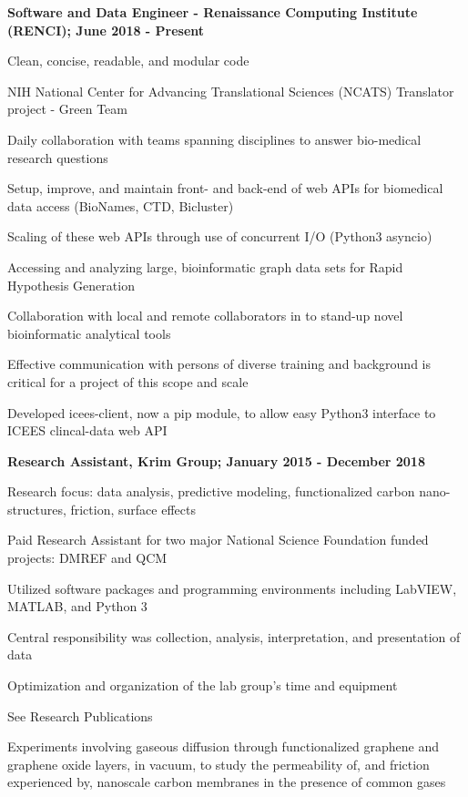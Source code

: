 \documentclass[letterpaper,final]{memoir}
\newcommand{\Sep}{\vspace{1.0em}}
\newcommand{\SmallSep}{\vspace{0.4em}}
\newcommand{\CVItem}[1]
	{\textbf{\color{Blue} #1}}
\begin{document}
\CVItem{Software and Data Engineer - Renaissance Computing Institute (RENCI); June 2018 - Present}
\begin{compactitem}[\color{Blue}$\circ$]
    
    \SmallSep
    \item Clean, concise, readable, and modular code
    \item NIH National Center for Advancing Translational Sciences (NCATS) Translator project - Green Team
    \item Daily collaboration with teams spanning disciplines to answer bio-medical research questions
    \item Setup, improve, and maintain front- and back-end of web APIs for biomedical data access (BioNames, CTD, Bicluster)
    \item Scaling of these web APIs through use of concurrent I/O (Python3 asyncio)
    \item Accessing and analyzing large, bioinformatic graph data sets for Rapid Hypothesis Generation
    \item Collaboration with local and remote collaborators in to stand-up novel bioinformatic analytical tools
    \item Effective communication with persons of diverse training and background is critical for a project of this scope and scale
    \item Developed icees-client, now a pip module, to allow easy Python3 interface to ICEES clincal-data web API    
\end{compactitem}

\Sep

\CVItem{Research Assistant, Krim Group; January 2015 - December 2018} 
\begin{compactitem}[\color{Blue}$\circ$]
   
    \SmallSep

    \item Research focus: data analysis, predictive modeling, functionalized carbon nano-structures, friction, surface effects
    \item Paid Research Assistant for two major National Science Foundation funded projects: DMREF and QCM
    \item Utilized software packages and programming environments including LabVIEW, MATLAB, and Python 3
    \item Central responsibility was collection, analysis, interpretation, and presentation of data
    \item Optimization and organization of the lab group's time and equipment
    \item See Research Publications
    \item Experiments involving gaseous diffusion through functionalized graphene and graphene oxide layers, in vacuum,
    to study the permeability of, and friction experienced by, nanoscale carbon membranes in the presence of common gases

\end{compactitem}
\end{document}

